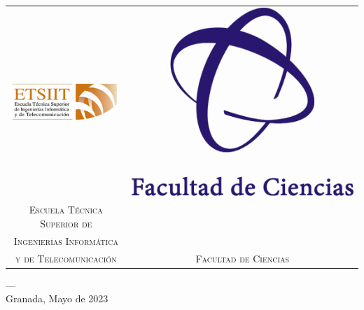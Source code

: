 \begin{titlepage}
\begin{minipage}{\textwidth}
\begin{tabular}{c c}
\includegraphics[scale=1]{imagenes/etsiit_logo.png} & \includegraphics[scale=0.2]{imagenes/ciencias_logo.png}\\
\textsc{Escuela Técnica Superior de}\\\textsc{Ingenierías Informática}\\\textsc{y de Telecomunicación} & \textsc{Facultad de Ciencias} \\
\end{tabular} 

\textsc{---}\\
Granada, Mayo de 2023
\end{minipage}
\end{titlepage}


